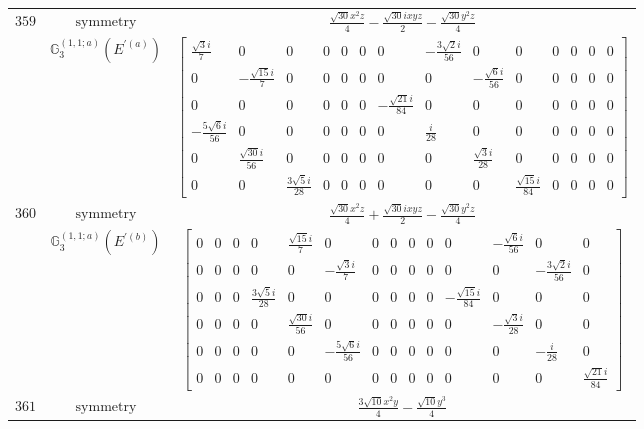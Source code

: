 \documentclass[fleqn,8pt,landscape]{jsarticle}
\begin{document}
\begin{longtable}{ccc}
$ 359 $ & $ \text{symmetry} $ & $ \frac{\sqrt{30} x^{2} z}{4} - \frac{\sqrt{30} i x y z}{2} - \frac{\sqrt{30} y^{2} z}{4} $ \\
$  $ & $ \mathbb{G}_{3}^{(1,1;a)}(E^{\prime(a)}) $ & $ \begin{bmatrix} \frac{\sqrt{3} i}{7} & 0 & 0 & 0 & 0 & 0 & 0 & - \frac{3 \sqrt{2} i}{56} & 0 & 0 & 0 & 0 & 0 & 0 \\ 0 & - \frac{\sqrt{15} i}{7} & 0 & 0 & 0 & 0 & 0 & 0 & - \frac{\sqrt{6} i}{56} & 0 & 0 & 0 & 0 & 0 \\ 0 & 0 & 0 & 0 & 0 & 0 & - \frac{\sqrt{21} i}{84} & 0 & 0 & 0 & 0 & 0 & 0 & 0 \\ - \frac{5 \sqrt{6} i}{56} & 0 & 0 & 0 & 0 & 0 & 0 & \frac{i}{28} & 0 & 0 & 0 & 0 & 0 & 0 \\ 0 & \frac{\sqrt{30} i}{56} & 0 & 0 & 0 & 0 & 0 & 0 & \frac{\sqrt{3} i}{28} & 0 & 0 & 0 & 0 & 0 \\ 0 & 0 & \frac{3 \sqrt{5} i}{28} & 0 & 0 & 0 & 0 & 0 & 0 & \frac{\sqrt{15} i}{84} & 0 & 0 & 0 & 0 \end{bmatrix} $ \\ \hline
$ 360 $ & $ \text{symmetry} $ & $ \frac{\sqrt{30} x^{2} z}{4} + \frac{\sqrt{30} i x y z}{2} - \frac{\sqrt{30} y^{2} z}{4} $ \\
$  $ & $ \mathbb{G}_{3}^{(1,1;a)}(E^{\prime(b)}) $ & $ \begin{bmatrix} 0 & 0 & 0 & 0 & \frac{\sqrt{15} i}{7} & 0 & 0 & 0 & 0 & 0 & 0 & - \frac{\sqrt{6} i}{56} & 0 & 0 \\ 0 & 0 & 0 & 0 & 0 & - \frac{\sqrt{3} i}{7} & 0 & 0 & 0 & 0 & 0 & 0 & - \frac{3 \sqrt{2} i}{56} & 0 \\ 0 & 0 & 0 & \frac{3 \sqrt{5} i}{28} & 0 & 0 & 0 & 0 & 0 & 0 & - \frac{\sqrt{15} i}{84} & 0 & 0 & 0 \\ 0 & 0 & 0 & 0 & \frac{\sqrt{30} i}{56} & 0 & 0 & 0 & 0 & 0 & 0 & - \frac{\sqrt{3} i}{28} & 0 & 0 \\ 0 & 0 & 0 & 0 & 0 & - \frac{5 \sqrt{6} i}{56} & 0 & 0 & 0 & 0 & 0 & 0 & - \frac{i}{28} & 0 \\ 0 & 0 & 0 & 0 & 0 & 0 & 0 & 0 & 0 & 0 & 0 & 0 & 0 & \frac{\sqrt{21} i}{84} \end{bmatrix} $ \\ \hline
$ 361 $ & $ \text{symmetry} $ & $ \frac{3 \sqrt{10} x^{2} y}{4} - \frac{\sqrt{10} y^{3}}{4} $ \\

\end{longtable}
\end{document}
